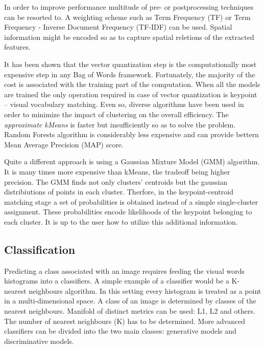 \documentclass[a4paper,12pt]{article}
\begin{document}
	In order to improve performance multitude of pre- or postprocessing techniques can be resorted to. A weighting scheme such as Term Frequency (TF) or Term Frequency - Inverse Document Frequency (TF-IDF) can be used. Spatial information might be encoded so as to capture spatial reletions of the extracted features.
	
	It has been shown that the vector quantization step is the computationally most expensive step in any Bag of Words framework. Fortunately, the majority of the cost is associated with the training part of the computation. When all the models are trained the only operation required in case of vector quantization is keypoint -- visual vocabulary matching. Even so, diverse algorithms have been used in order to minimize the impact of clustering on the overall efficiency. The \emph{approximate kMeans} is faster but insufficiently so as to solve the problem. Random Forests algorithm is considerably less expensive and can provide bettern Mean Average Precision (MAP) score.
	
	Quite a different approach is using a Gaussian Mixture Model (GMM) algorithm. It is many times more expensive than kMeans, the tradeoff being higher precision. The GMM finds not only clusters' centroids but the gaussian distribiutions of points in each cluster. Therfore, in the keypoint-centroid matching stage a set of probabilities is obtained instead of a simple single-cluster assignment. These probabilities encode likelihoods of the keypoint belonging to each cluster. It is up to the user how to utilize this additional information.

\subsection{Classification}

	Predicting a class associated with an image requires feeding the visual words histograms into a classifiers. A simple example of a classifier would be a K-nearest neighbours algorithm. In this setting every histogram is treated as a point in a multi-dimensional space. A class of an image is determined by classes of the nearest neighbours. Manifold of distinct metrics can be used: L1, L2  and others. The number of nearest neighbours (K) has to be determined. More advanced classifiers can be divided into the two main classes: generative models and discriminative models.
	
\end{document}
